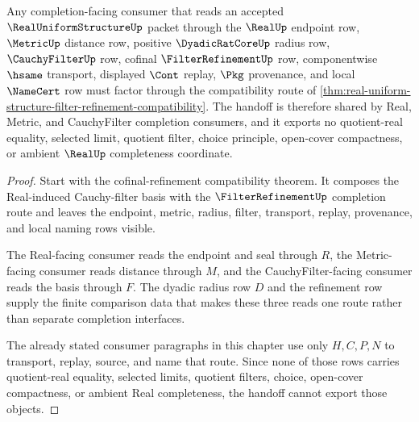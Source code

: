 \begin{theorem}
\label{thm:real-uniform-structure-filter-refinement-handoff}
Any completion-facing consumer that reads an accepted $\RealUniformStructureUp$ packet through the $\RealUp$ endpoint row, $\MetricUp$ distance row, positive $\DyadicRatCoreUp$ radius row, $\CauchyFilterUp$ row, cofinal $\FilterRefinementUp$ row, componentwise $\hsame$ transport, displayed $\Cont$ replay, $\Pkg$ provenance, and local $\NameCert$ row must factor through the compatibility route of \autoref{thm:real-uniform-structure-filter-refinement-compatibility}. The handoff is therefore shared by Real, Metric, and CauchyFilter completion consumers, and it exports no quotient-real equality, selected limit, quotient filter, choice principle, open-cover compactness, or ambient $\RealUp$ completeness coordinate.
\end{theorem}
\begin{proof}
Start with the cofinal-refinement compatibility theorem. It composes the Real-induced Cauchy-filter basis with the $\FilterRefinementUp$ completion route and leaves the endpoint, metric, radius, filter, transport, replay, provenance, and local naming rows visible.

The Real-facing consumer reads the endpoint and seal through $R$, the Metric-facing consumer reads distance through $M$, and the CauchyFilter-facing consumer reads the basis through $F$. The dyadic radius row $D$ and the refinement row supply the finite comparison data that makes these three reads one route rather than separate completion interfaces.

The already stated consumer paragraphs in this chapter use only $H,C,P,N$ to transport, replay, source, and name that route. Since none of those rows carries quotient-real equality, selected limits, quotient filters, choice, open-cover compactness, or ambient Real completeness, the handoff cannot export those objects.
\end{proof}


